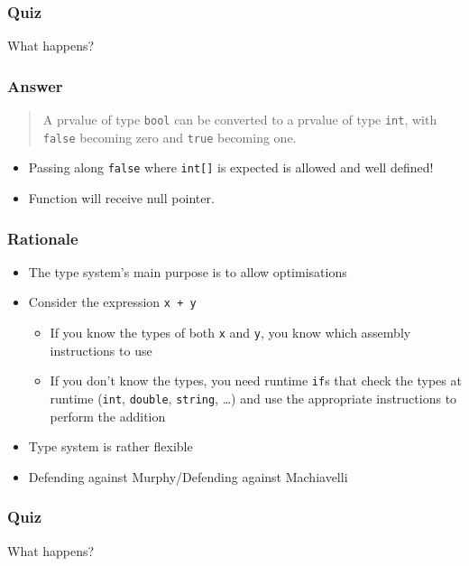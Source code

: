 \documentclass{../ucll-slides}
\begin{document}
\begin{frame}
  \frametitle{Quiz}
  \begin{center}
    {\Large What happens?}
  \end{center}
\end{frame}

\begin{frame}
  \frametitle{Answer}
  \begin{quote}
    A prvalue of type {\tt bool} can be converted to a prvalue of type {\tt int}, with {\tt false} becoming zero and {\tt true}
    becoming one. \\
    \hfill {}
  \end{quote}
  \begin{itemize}
    \item Passing along {\tt false} where {\tt int[]} is expected is allowed and well defined!
    \item Function will receive null pointer.
  \end{itemize}
\end{frame}

\begin{frame}
  \frametitle{Rationale}
  \begin{itemize}
    \item The type system's main purpose is to allow optimisations
    \item Consider the expression {\tt x + y} 
          \begin{itemize}
            \item If you know the types of both {\tt x} and {\tt y}, you know
                  which assembly instructions to use
            \item If you don't know the types, you need runtime {\tt if}s that check
                  the types at runtime ({\tt int}, {\tt double}, {\tt string}, \dots)
                  and use the appropriate instructions to perform the addition
          \end{itemize}
    \item Type system is rather flexible
    \item Defending against Murphy/Defending against Machiavelli
  \end{itemize}
\end{frame}

\begin{frame}
  \frametitle{Quiz}
  \begin{center}
    {\Large What happens?}
  \end{center}
\end{frame}
\end{document}
